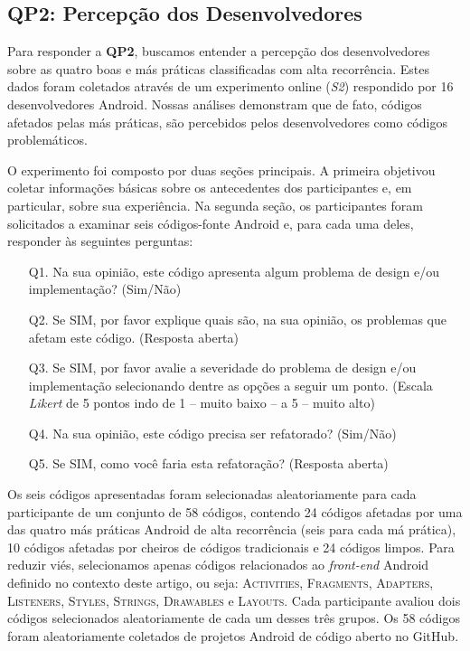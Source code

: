 \subsection{QP2: Percepção dos Desenvolvedores}
\label{sub:perception}

Para responder a \textbf{QP2}, buscamos entender a percepção dos desenvolvedores sobre as quatro boas e más práticas classificadas com alta recorrência. Estes dados foram coletados através de um experimento online (\textit{S2}) respondido por 16 desenvolvedores Android. Nossas análises demonstram que de fato, códigos afetados pelas más práticas, são percebidos pelos desenvolvedores como códigos problemáticos.



O experimento foi composto por duas seções principais. A primeira objetivou coletar informações básicas sobre os antecedentes dos participantes e, em particular, sobre sua experiência. Na segunda seção, os participantes foram solicitados a examinar seis códigos-fonte Android e, para cada uma deles, responder às seguintes perguntas:

\begin{itemize}
	\item[Q1.] Na sua opinião, este código apresenta algum problema de design e/ou implementação? (Sim/Não) 

	\item[Q2.] Se SIM, por favor explique quais são, na sua opinião, os problemas que afetam este código. (Resposta aberta)

	\item[Q3.] Se SIM, por favor avalie a severidade do problema de design e/ou implementação selecionando dentre as opções a seguir um ponto. (Escala \textit{Likert} de 5 pontos indo de 1 -- muito baixo -- a 5 -- muito alto)

	\item[Q4.] Na sua opinião, este código precisa ser refatorado? (Sim/Não)

	\item[Q5.] Se SIM, como você faria esta refatoração? (Resposta aberta)
\end{itemize}

Os seis códigos apresentadas foram selecionadas aleatoriamente para cada participante de um conjunto de 58 códigos, contendo 24 códigos afetadas por uma das quatro más práticas Android de alta recorrência (seis para cada má prática), 10 códigos afetadas por cheiros de códigos tradicionais e 24 códigos limpos. Para reduzir viés, selecionamos apenas códigos relacionados ao \textit{front-end} Android definido no contexto deste artigo, ou seja: \textsc{Activities}, \textsc{Fragments}, \textsc{Adapters}, \textsc{Listeners}, \textsc{Styles}, \textsc{Strings}, \textsc{Drawables} e \textsc{Layouts}. Cada participante avaliou dois códigos selecionados aleatoriamente de cada um desses três grupos. Os 58 códigos foram aleatoriamente coletados de projetos Android de código aberto no GitHub.

